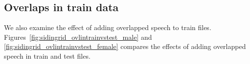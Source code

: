 {%


%	


\subsection{Overlaps in train data}
We also examine the effect of adding overlapped speech to train files. 
Figures~\ref{fig:sidingrid_ovlintrainvstest_male} and \ref{fig:sidingrid_ovlintrainvstest_female} compares the effects of adding overlapped speech in train and test files. 

}
